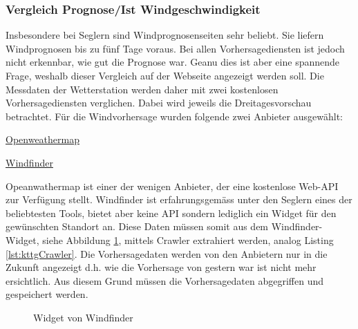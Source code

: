\subsubsection{Vergleich Prognose/Ist Windgeschwindigkeit}
Insbesondere bei Seglern sind Windprognosenseiten sehr beliebt. Sie liefern Windprognosen bis zu fünf Tage voraus. Bei allen Vorhersagediensten ist jedoch nicht erkennbar, wie gut die Prognose war. Geanu dies ist aber eine spannende Frage, weshalb dieser Vergleich auf der Webseite angezeigt werden soll. Die Messdaten der Wetterstation werden daher mit zwei kostenlosen Vorhersagediensten verglichen. Dabei wird jeweils die Dreitagesvorschau betrachtet. Für die Windvorhersage wurden folgende zwei Anbieter ausgewählt:

\begin{itemize*}
\item \href{https://openweathermap.org/city/2661731}{Openweathermap}
\item \href{https://www.windfinder.com/forecast/arbon}{Windfinder}
\end{itemize*}

\noindent
Opeanwathermap ist einer der wenigen Anbieter, der eine kostenlose Web-API zur Verfügung stellt. Windfinder ist erfahrungsgemäss unter den Seglern eines der beliebtesten Tools, bietet aber keine API sondern lediglich ein Widget für den gewünschten Standort an. Diese Daten müssen somit aus dem Windfinder-Widget, siehe Abbildung \ref{img:windfinder}, mittels Crawler extrahiert werden, analog Listing \ref{lst:kttgCrawler}. Die Vorhersagedaten werden von den Anbietern nur in die Zukunft angezeigt d.h. wie die Vorhersage von gestern war ist nicht mehr ersichtlich. Aus diesem Grund müssen die Vorhersagedaten abgegriffen und gespeichert werden.


\begin{figure}[h!]
	\centering
	\caption{Widget von Windfinder}
	\label{img:windfinder}
\end{figure}

